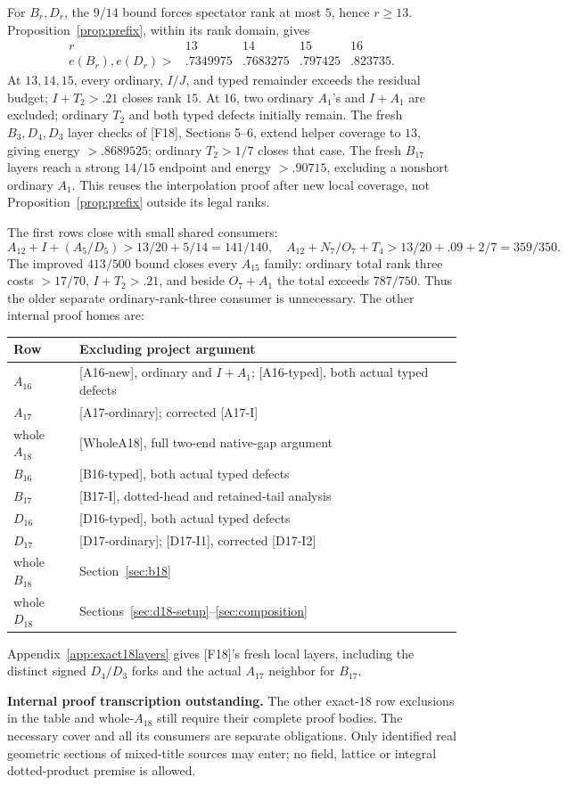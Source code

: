 \documentclass[11pt]{article}
\theoremstyle{definition}
\theoremstyle{remark}
\newcommand{\src}[1]{\textnormal{\textsf{[#1]}}}
\newcommand{\pending}[1]{\par\smallskip\noindent
  {\color{red!65!black}\textbf{Internal proof transcription outstanding.} #1}\par\smallskip}
\begin{document}
For \(B_r,D_r\), the \(9/14\) bound forces spectator rank
at most \(5\), hence \(r\geq13\).
Proposition~\ref{prop:prefix}, within its rank domain, gives
\[
\begin{array}{c|rrrr}
r&13&14&15&16\\ \hline
e(B_r),e(D_r)>&.7349975&.7683275&.797425&.823735.
\end{array}
\]
At \(13,14,15\), every ordinary, \(I/J\), and typed remainder
exceeds the residual budget; \(I+T_2>.21\) closes rank \(15\).
At \(16\), two ordinary \(A_1\)'s and \(I+A_1\) are excluded;
ordinary \(T_2\) and both typed defects initially remain.
The fresh \(B_3,D_4,D_3\) layer checks of \src{F18},
Sections 5--6, extend helper coverage to \(13\), giving
energy \(>.8689525\); ordinary \(T_2>1/7\) closes that case.
The fresh \(B_{17}\) layers reach a strong \(14/15\) endpoint
and energy \(>.90715\), excluding a nonshort ordinary \(A_1\).
This reuses the interpolation proof after new local coverage,
not Proposition~\ref{prop:prefix} outside its legal ranks.

The first rows close with small shared consumers:
\[
 A_{12}+I+(A_5/D_5)>13/20+5/14=141/140,\quad
 A_{12}+N_7/O_7+T_4>13/20+.09+2/7=359/350.
\]
The improved \(413/500\) bound closes every \(A_{15}\) family:
ordinary total rank three costs \(>17/70\), \(I+T_2>.21\),
and beside \(O_7+A_1\) the total exceeds \(787/750\).
Thus the older separate ordinary-rank-three consumer is unnecessary.
The other internal proof homes are:
\begin{center}\small
\begin{tabular}{lp{.69\linewidth}}
\toprule
Row&Excluding project argument\\ \midrule
\(A_{16}\)&\src{A16-new}, ordinary and \(I+A_1\);
 \src{A16-typed}, both actual typed defects\\
\(A_{17}\)&\src{A17-ordinary}; corrected \src{A17-I}\\
whole \(A_{18}\)&\src{WholeA18}, full two-end native-gap argument\\
\(B_{16}\)&\src{B16-typed}, both actual typed defects\\
\(B_{17}\)&\src{B17-I}, dotted-head and retained-tail analysis\\
\(D_{16}\)&\src{D16-typed}, both actual typed defects\\
\(D_{17}\)&\src{D17-ordinary}; \src{D17-I1}, corrected \src{D17-I2}\\
whole \(B_{18}\)&Section~\ref{sec:b18}\\
whole \(D_{18}\)&Sections~\ref{sec:d18-setup}--\ref{sec:composition}\\
\bottomrule
\end{tabular}
\end{center}
Appendix~\ref{app:exact18layers} gives \src{F18}'s fresh local
layers, including the distinct signed \(D_4/D_3\) forks and the
actual \(A_{17}\) neighbor for \(B_{17}\).
\pending{The other exact-\(18\) row exclusions in the table and
whole-\(A_{18}\) still require their complete proof bodies.
The necessary cover and all its consumers are separate obligations.
Only identified real geometric sections of mixed-title sources
may enter; no field, lattice or integral dotted-product premise is allowed.}
\end{document}
